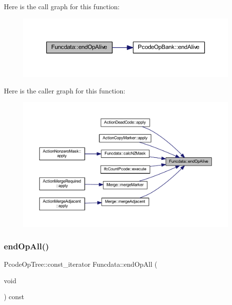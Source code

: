Here is the call graph for this function\+:
\nopagebreak
\begin{figure}[H]
\begin{center}
\leavevmode
\includegraphics[width=350pt]{class_funcdata_a01a64130db5cbaaa972eed4509933870_cgraph}
\end{center}
\end{figure}
Here is the caller graph for this function\+:
\nopagebreak
\begin{figure}[H]
\begin{center}
\leavevmode
\includegraphics[width=350pt]{class_funcdata_a01a64130db5cbaaa972eed4509933870_icgraph}
\end{center}
\end{figure}
\mbox{\label{class_funcdata_a7e51e10ff92ea150cb4fe73d4fdd64dd}} 
\subsubsection{\texorpdfstring{endOpAll()}{endOpAll()}}
{\footnotesize\ttfamily Pcode\+Op\+Tree\+::const\+\_\+iterator Funcdata\+::end\+Op\+All (\begin{DoxyParamCaption}\item[{void}]{ }\end{DoxyParamCaption}) const\hspace{0.3cm}{\ttfamily [inline]}}



